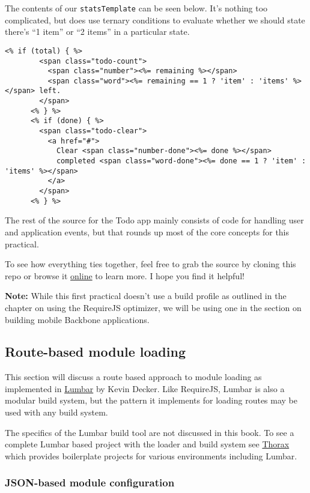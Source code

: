 \documentclass[9pt]{book}
\begin{document}
The contents of our \texttt{statsTemplate} can be seen below. It's
nothing too complicated, but does use ternary conditions to evaluate
whether we should state there's ``1 item'' or ``2 items'' in a
particular state.

\begin{verbatim}
<% if (total) { %>
        <span class="todo-count">
          <span class="number"><%= remaining %></span>
          <span class="word"><%= remaining == 1 ? 'item' : 'items' %></span> left.
        </span>
      <% } %>
      <% if (done) { %>
        <span class="todo-clear">
          <a href="#">
            Clear <span class="number-done"><%= done %></span>
            completed <span class="word-done"><%= done == 1 ? 'item' : 'items' %></span>
          </a>
        </span>
      <% } %>
\end{verbatim}

The rest of the source for the Todo app mainly consists of code for
handling user and application events, but that rounds up most of the
core concepts for this practical.

To see how everything ties together, feel free to grab the source by
cloning this repo or browse it
\href{https://github.com/addyosmani/backbone-fundamentals/tree/master/practicals/modular-todo-app}{online}
to learn more. I hope you find it helpful!

\textbf{Note:} While this first practical doesn't use a build profile as
outlined in the chapter on using the RequireJS optimizer, we will be
using one in the section on building mobile Backbone applications.

\subsection{Route-based module
loading}\label{route-based-module-loading}

This section will discuss a route based approach to module loading as
implemented in \href{http://walmartlabs.github.com/lumbar}{Lumbar} by
Kevin Decker. Like RequireJS, Lumbar is also a modular build system, but
the pattern it implements for loading routes may be used with any build
system.

The specifics of the Lumbar build tool are not discussed in this book.
To see a complete Lumbar based project with the loader and build system
see \href{http://thoraxjs.org}{Thorax} which provides boilerplate
projects for various environments including Lumbar.

\subsubsection{JSON-based module
configuration}\label{json-based-module-configuration}
\end{document}
